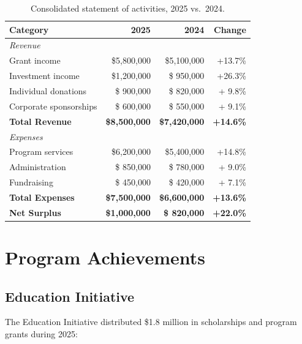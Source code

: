 \documentclass[
    language=english,
    doctype=article,
    institution=none,
]{../../omnilatex}
\begin{document}
\begin{table}[h]
    \centering
    \begin{tabular}{lrrr}
        \toprule
        \textbf{Category} & \textbf{2025} & \textbf{2024} & \textbf{Change} \\
        \midrule
        \multicolumn{4}{l}{\textit{Revenue}} \\
        \quad Grant income          & \$5,800,000 & \$5,100,000 & +13.7\% \\
        \quad Investment income     & \$1,200,000 & \$  950,000 & +26.3\% \\
        \quad Individual donations  & \$  900,000 & \$  820,000 & + 9.8\% \\
        \quad Corporate sponsorships & \$  600,000 & \$  550,000 & + 9.1\% \\
        \midrule
        \textbf{Total Revenue}      & \textbf{\$8,500,000} & \textbf{\$7,420,000} & \textbf{+14.6\%} \\
        \midrule
        \multicolumn{4}{l}{\textit{Expenses}} \\
        \quad Program services      & \$6,200,000 & \$5,400,000 & +14.8\% \\
        \quad Administration        & \$  850,000 & \$  780,000 & + 9.0\% \\
        \quad Fundraising           & \$  450,000 & \$  420,000 & + 7.1\% \\
        \midrule
        \textbf{Total Expenses}     & \textbf{\$7,500,000} & \textbf{\$6,600,000} & \textbf{+13.6\%} \\
        \midrule
        \textbf{Net Surplus}        & \textbf{\$1,000,000} & \textbf{\$  820,000} & \textbf{+22.0\%} \\
        \bottomrule
    \end{tabular}
    \caption{Consolidated statement of activities, 2025 vs.\ 2024.}
\end{table}

\section{Program Achievements}

\subsection{Education Initiative}

The Education Initiative distributed \$1.8 million in scholarships and
program grants during 2025:
\end{document}

